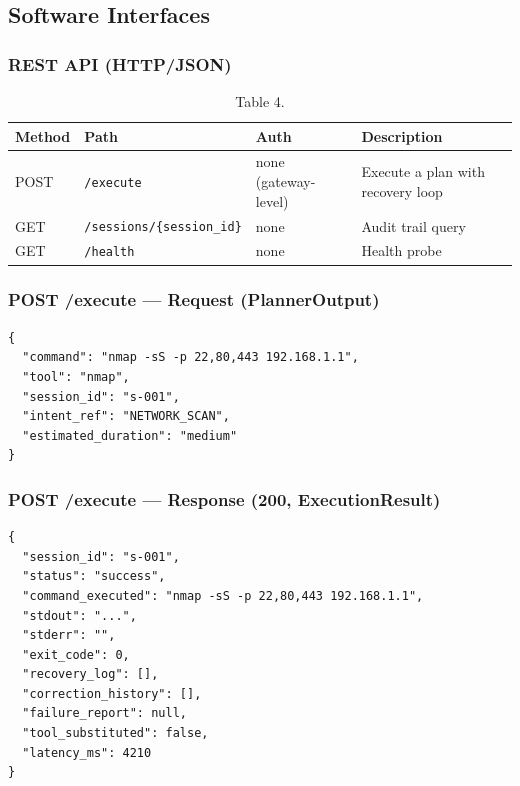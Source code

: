 \documentclass[10pt,journal,onecolumn]{IEEEtran}
\begin{document}
\subsection{Software Interfaces}

\subsubsection{REST API (HTTP/JSON)}

\begin{table}[h]
\caption{Table 4.}
\label{tab:t4}
\begin{tabularx}{\columnwidth}{l >{\raggedright\arraybackslash}X >{\raggedright\arraybackslash}X >{\raggedright\arraybackslash}X}
\toprule
\textbf{Method} & \textbf{Path} & \textbf{Auth} & \textbf{Description}\\
\midrule
POST & \texttt{/execute} & none (gateway-level) & Execute a plan with recovery loop\\
GET & \texttt{/\allowbreak sessions/\allowbreak \{session\_\allowbreak id\}} & none & Audit trail query\\
GET & \texttt{/health} & none & Health probe\\
\bottomrule
\end{tabularx}
\end{table}

\subsubsection{POST /execute --- Request (PlannerOutput)}

\begin{lstlisting}
{
  "command": "nmap -sS -p 22,80,443 192.168.1.1",
  "tool": "nmap",
  "session_id": "s-001",
  "intent_ref": "NETWORK_SCAN",
  "estimated_duration": "medium"
}
\end{lstlisting}

\subsubsection{POST /execute --- Response (200, ExecutionResult)}

\begin{lstlisting}
{
  "session_id": "s-001",
  "status": "success",
  "command_executed": "nmap -sS -p 22,80,443 192.168.1.1",
  "stdout": "...",
  "stderr": "",
  "exit_code": 0,
  "recovery_log": [],
  "correction_history": [],
  "failure_report": null,
  "tool_substituted": false,
  "latency_ms": 4210
}
\end{lstlisting}
\end{document}
